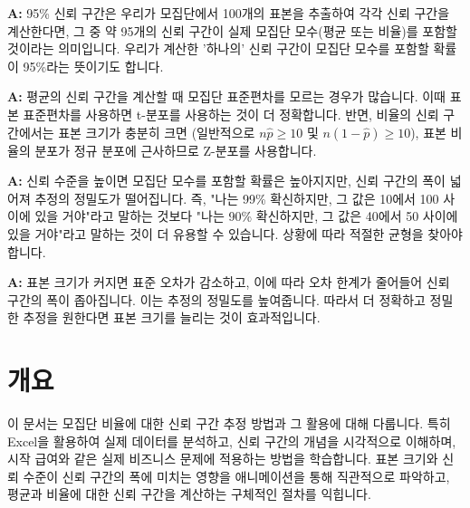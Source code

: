 \documentclass[11pt,a4paper]{book}
\theoremstyle{definition}
\begin{document}
\begin{summarybox}[title=Q1: 95\% 신뢰 구간이 정확히 무엇을 의미하나요?]
\textbf{A:} 95\% 신뢰 구간은 우리가 모집단에서 100개의 표본을 추출하여 각각 신뢰 구간을 계산한다면, 그 중 약 95개의 신뢰 구간이 실제 모집단 모수(평균 또는 비율)를 포함할 것이라는 의미입니다. 우리가 계산한 '하나의' 신뢰 구간이 모집단 모수를 포함할 확률이 95\%라는 뜻이기도 합니다.
\end{summarybox}

\begin{infobox}[title=Q2: 왜 평균 신뢰 구간에서는 t-분포를 사용하고, 비율 신뢰 구간에서는 Z-분포를 사용하나요?]
\textbf{A:} 평균의 신뢰 구간을 계산할 때 모집단 표준편차를 모르는 경우가 많습니다. 이때 표본 표준편차를 사용하면 t-분포를 사용하는 것이 더 정확합니다. 반면, 비율의 신뢰 구간에서는 표본 크기가 충분히 크면 (일반적으로 $n\hat{p} \ge 10$ 및 $n(1-\hat{p}) \ge 10$), 표본 비율의 분포가 정규 분포에 근사하므로 Z-분포를 사용합니다.
\end{infobox}

\begin{importantbox}[title=Q3: 신뢰 수준을 높이면 항상 좋은 건가요?]
\textbf{A:} 신뢰 수준을 높이면 모집단 모수를 포함할 확률은 높아지지만, 신뢰 구간의 폭이 넓어져 추정의 정밀도가 떨어집니다. 즉, "나는 99\% 확신하지만, 그 값은 10에서 100 사이에 있을 거야"라고 말하는 것보다 "나는 90\% 확신하지만, 그 값은 40에서 50 사이에 있을 거야"라고 말하는 것이 더 유용할 수 있습니다. 상황에 따라 적절한 균형을 찾아야 합니다.
\end{importantbox}

\begin{warningbox}[title=Q4: 표본 크기가 신뢰 구간에 어떤 영향을 미치나요?]
\textbf{A:} 표본 크기가 커지면 표준 오차가 감소하고, 이에 따라 오차 한계가 줄어들어 신뢰 구간의 폭이 좁아집니다. 이는 추정의 정밀도를 높여줍니다. 따라서 더 정확하고 정밀한 추정을 원한다면 표본 크기를 늘리는 것이 효과적입니다.
\end{warningbox}


\section{개요}
이 문서는 모집단 비율에 대한 신뢰 구간 추정 방법과 그 활용에 대해 다룹니다. 특히 Excel을 활용하여 실제 데이터를 분석하고, 신뢰 구간의 개념을 시각적으로 이해하며, 시작 급여와 같은 실제 비즈니스 문제에 적용하는 방법을 학습합니다. 표본 크기와 신뢰 수준이 신뢰 구간의 폭에 미치는 영향을 애니메이션을 통해 직관적으로 파악하고, 평균과 비율에 대한 신뢰 구간을 계산하는 구체적인 절차를 익힙니다.
\end{document}

